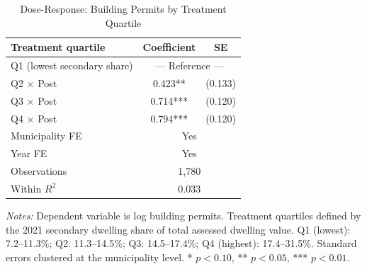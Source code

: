 \begin{table}[t]
\centering
\caption{Dose-Response: Building Permits by Treatment Quartile}
\label{tab:dose}
\begin{tabular}{lcc}
\hline\hline
Treatment quartile & Coefficient & SE \\
\hline
Q1 (lowest secondary share) & \multicolumn{2}{c}{--- Reference ---} \\
Q2 $\times$ Post & 0.423** & (0.133) \\
Q3 $\times$ Post & 0.714*** & (0.120) \\
Q4 $\times$ Post & 0.794*** & (0.120) \\
\hline
Municipality FE & \multicolumn{2}{c}{Yes} \\
Year FE & \multicolumn{2}{c}{Yes} \\
Observations & \multicolumn{2}{c}{1,780} \\
Within $R^2$ & \multicolumn{2}{c}{0.033} \\
\hline\hline
\end{tabular}
\begin{minipage}{0.85\textwidth}
\vspace{0.3em}
\footnotesize \textit{Notes:} Dependent variable is log building permits. Treatment quartiles defined by the 2021 secondary dwelling share of total assessed dwelling value. Q1 (lowest): 7.2--11.3\%; Q2: 11.3--14.5\%; Q3: 14.5--17.4\%; Q4 (highest): 17.4--31.5\%. Standard errors clustered at the municipality level. * $p<0.10$, ** $p<0.05$, *** $p<0.01$.
\end{minipage}
\end{table}
